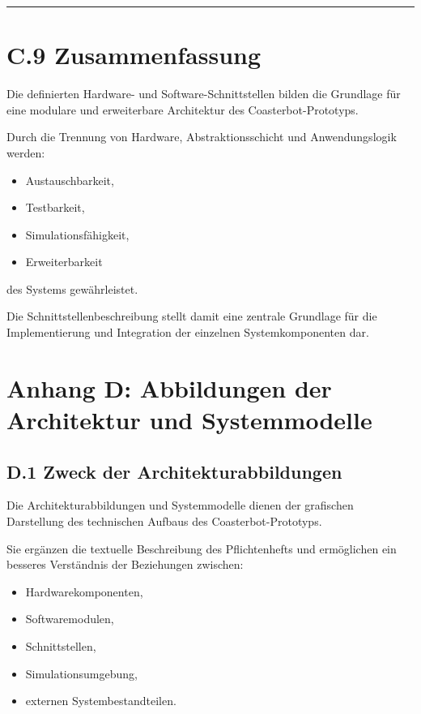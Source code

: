 \documentclass[
  a4paper,
  12pt,
  DIV=12,        %
  parskip=half,  %
  headings=small %
]{scrartcl}
\theoremstyle{definition}
\providecommand{\tightlist}{%
  \setlength{\itemsep}{0pt}\setlength{\parskip}{0pt}}
\theoremstyle{definition}
\providecommand{\tightlist}{%
  \setlength{\itemsep}{0pt}\setlength{\parskip}{0pt}}
\begin{document}
\begin{center}\rule{0.5\linewidth}{0.5pt}\end{center}

\section{C.9 Zusammenfassung}\label{c.9-zusammenfassung}

Die definierten Hardware- und Software-Schnittstellen bilden die
Grundlage für eine modulare und erweiterbare Architektur des
Coasterbot-Prototyps.

Durch die Trennung von Hardware, Abstraktionsschicht und Anwendungslogik
werden:

\begin{itemize}
\tightlist
\item
  Austauschbarkeit,
\item
  Testbarkeit,
\item
  Simulationsfähigkeit,
\item
  Erweiterbarkeit
\end{itemize}

des Systems gewährleistet.

Die Schnittstellenbeschreibung stellt damit eine zentrale Grundlage für
die Implementierung und Integration der einzelnen Systemkomponenten dar.

\section{Anhang D: Abbildungen der Architektur und
Systemmodelle}\label{anhang-d-abbildungen-der-architektur-und-systemmodelle}

\subsection{D.1 Zweck der
Architekturabbildungen}\label{d.1-zweck-der-architekturabbildungen}

Die Architekturabbildungen und Systemmodelle dienen der grafischen
Darstellung des technischen Aufbaus des Coasterbot-Prototyps.

Sie ergänzen die textuelle Beschreibung des Pflichtenhefts und
ermöglichen ein besseres Verständnis der Beziehungen zwischen:

\begin{itemize}
\tightlist
\item
  Hardwarekomponenten,
\item
  Softwaremodulen,
\item
  Schnittstellen,
\item
  Simulationsumgebung,
\item
  externen Systembestandteilen.
\end{itemize}
\end{document}
